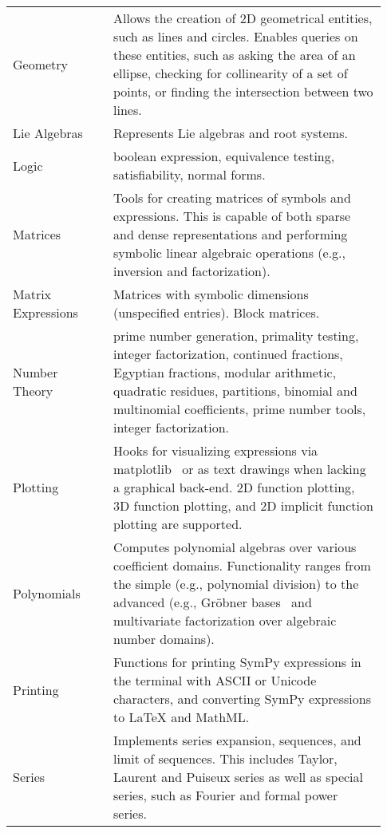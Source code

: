 \begin{longtable}[htbc]{p{0.25\linewidth}p{0.68\linewidth}}
Geometry & Allows the creation of 2D geometrical entities, such as lines and
circles. Enables queries on these entities, such as asking the area of an
ellipse, checking for collinearity of a set of
points, or finding the intersection between two lines.\\

Lie Algebras & Represents Lie algebras and root systems.\\

Logic & boolean expression, equivalence testing, satisfiability, normal
forms.\\

Matrices & Tools for creating matrices of symbols and expressions. This is
capable of both sparse and dense representations and performing
symbolic linear algebraic operations (e.g., inversion and factorization).\\

Matrix Expressions & Matrices with symbolic dimensions (unspecified entries).
Block matrices.\\

Number Theory & prime number generation, primality testing, integer
factorization, continued fractions, Egyptian fractions, modular arithmetic,
quadratic residues, partitions, binomial and multinomial coefficients,
prime number tools, integer factorization. \\

Plotting & Hooks for visualizing expressions via matplotlib~\cite{Hunter:2007}
or as text drawings when lacking a graphical back-end. 2D function plotting,
3D function
plotting, and 2D implicit function plotting are supported.\\

Polynomials & Computes polynomial algebras over various coefficient domains.
Functionality ranges from the simple (e.g., polynomial division) to the
advanced (e.g., Gr\"obner bases~\cite{adams1994introduction} and multivariate
factorization over algebraic number domains).\\

Printing & Functions for printing SymPy expressions in the terminal with ASCII
or Unicode characters, and converting SymPy expressions to \LaTeX{} and
MathML.\\

Series & Implements series expansion, sequences, and limit of sequences.
This includes Taylor, Laurent and Puiseux series as well as special series, such
as Fourier and formal power series.\\


\end{longtable}
